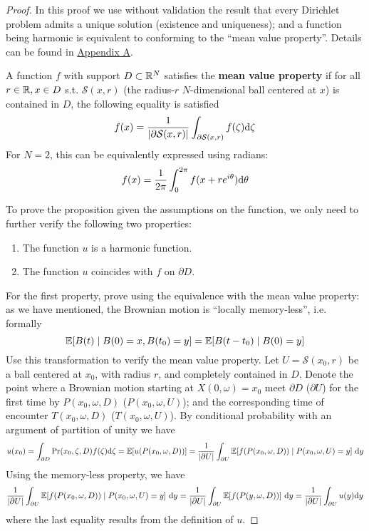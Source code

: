 \documentclass[10pt]{article}
\begin{document}
\begin{proof}
    In this proof we use without validation the result that every Dirichlet problem admits a unique solution (existence and uniqueness); and a function being harmonic is equivalent to conforming to the ``mean value property''. Details can be found in \hyperref[appendix A]{Appendix A}.

    \begin{paraindent}
        \begin{definition}\label{def: mean value property}
            A function $f$ with support $D \subset \mathbb{R}^N$ satisfies the \textbf{mean value property} if for all $r \in \mathbb{R}, x \in D$ s.t. $\mathcal{S}(x, r)$ (the radius-$r$ $N$-dimensional ball centered at $x$) is contained in $D$, the following equality is satisfied
            \[
                f(x) = \frac{1}{\left|\partial \mathcal{S}(x, r)\right|}\int_{\partial \mathcal{S}(x, r)} f(\zeta) \mathrm{d} \zeta
            \]
            For $N = 2$, this can be equivalently expressed using radians:
            \[
                f(x) = \frac{1}{2 \pi} \int_0^{2\pi} f(x + r e^{i \theta}) \mathrm{d} \theta 
            \]
        \end{definition}
    \end{paraindent}

    To prove the proposition given the assumptions on the function, we only need to further verify the following two properties:
    \begin{enumerate}
        \item The function $u$ is a harmonic function.
        \item The function $u$ coincides with $f$ on $\partial D$.
    \end{enumerate}

    For the first property, prove using the equivalence with the mean value property: as we have mentioned, the Brownian motion is ``locally memory-less'', i.e. formally
    \[
        \mathbb{E}[B(t) \mid B(0) = x, B(t_0) = y] = \mathbb{E}[B(t - t_0) \mid B(0) = y]
    \]
    Use this transformation to verify the mean value property. Let $U = \mathcal{S}(x_0, r)$ be a ball centered at $x_0$, with radius $r$, and completely contained in $D$. Denote the point where a Brownian motion starting at $X(0, \omega) = x_0$ meet $\partial D$ ($\partial U$) for the first time by $P(x_0, \omega, D)$ ($P(x_0, \omega, U)$); and the corresponding time of encounter $T(x_0, \omega, D)$ ($T(x_0, \omega, U)$). By conditional probability with an argument of partition of unity we have
    \[
        u(x_0) = \int_{\partial D} \mathrm{Pr}(x_0, \zeta, D) f(\zeta) \mathrm{d} \zeta = \mathbb{E}[u(P(x_0, \omega, D))] = \frac{1}{\left|\partial U\right|} \int_{\partial U} \mathbb{E}[f(P(x_0, \omega, D)) \mid P(x_0, \omega, U) = y]\ \mathrm{d} y
    \]
    Using the memory-less property, we have
    \[
        \frac{1}{\left|\partial U\right|} \int_{\partial U} \mathbb{E}[f(P(x_0, \omega, D)) \mid P(x_0, \omega, U) = y]\ \mathrm{d} y = \frac{1}{\left|\partial U\right|} \int_{\partial U} \mathbb{E}[ f(P(y, \omega, D)) ]\ \mathrm{d} y = \frac{1}{\left|\partial U\right|} \int_{\partial U} u(y) \mathrm{d} y
    \]
    where the last equality results from the definition of $u$. 


\end{proof}
\end{document}
